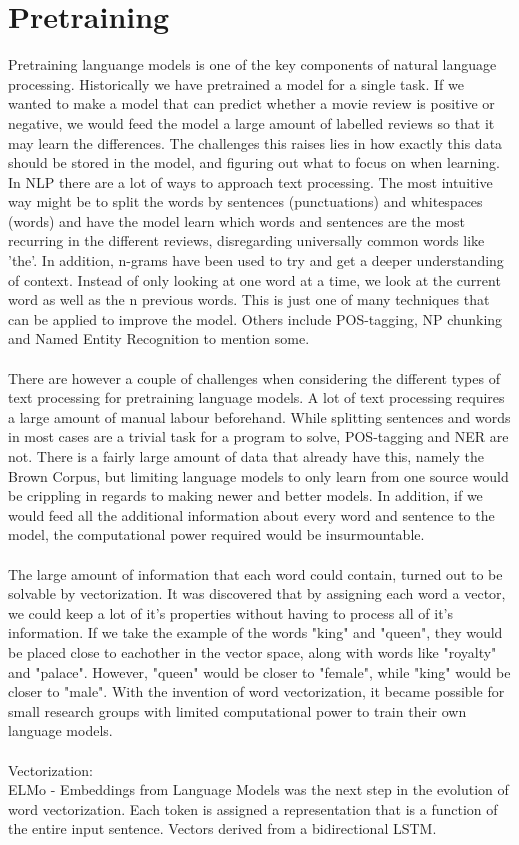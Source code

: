 \documentclass{report}
\begin{document}
\section{Pretraining}
Pretraining languange models is one of the key components of natural language processing. Historically we have pretrained a model for a single task. If we wanted to make a model that can predict whether a movie review is positive or negative, we would feed the model a large amount of labelled reviews so that it may learn the differences. The challenges this raises lies in how exactly this data should be stored in the model, and figuring out what to focus on when learning. In NLP there are a lot of ways to approach text processing. The most intuitive way might be to split the words by sentences (punctuations) and whitespaces (words) and have the model learn which words and sentences are the most recurring in the different reviews, disregarding universally common words like 'the'. In addition, n-grams have been used to try and get a deeper understanding of context. Instead of only looking at one word at a time, we look at the current word as well as the n previous words. This is just one of many techniques that can be applied to improve the model. Others include POS-tagging, NP chunking and Named Entity Recognition to mention some.\\\\
\noindent
There are however a couple of challenges when considering the different types of text processing for pretraining language models. A lot of text processing requires a large amount of manual labour beforehand. While splitting sentences and words in most cases are a trivial task for a program to solve, POS-tagging and NER are not. There is a fairly large amount of data that already have this, namely the Brown Corpus, but limiting language models to only learn from one source would be crippling in regards to making newer and better models. In addition, if we would feed all the additional information about every word and sentence to the model, the computational power required would be insurmountable. 
\\\\
\noindent
The large amount of information that each word could contain, turned out to be solvable by vectorization. It was discovered that by assigning each word a vector, we could keep a lot of it's properties without having to process all of it's information. If we take the example of the words "king" and "queen", they would be placed close to eachother in the vector space, along with words like "royalty" and "palace". However, "queen" would be closer to "female", while "king" would be closer to "male". With the invention of word vectorization, it became possible for small research groups with limited computational power to train their own language models.
\\\\
\noindent
Vectorization:\\
ELMo - Embeddings from Language Models was the next step in the evolution of word vectorization. Each token is assigned a representation that is a function of the entire input sentence. Vectors derived from a bidirectional LSTM.
\end{document}
